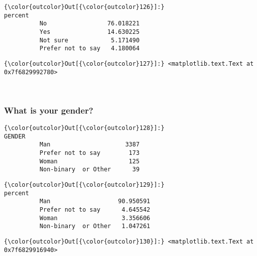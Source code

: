\documentclass[11pt]{article}
\begin{document}
            \begin{Verbatim}[commandchars=\\\{\}]
{\color{outcolor}Out[{\color{outcolor}126}]:}                      percent
          No                 76.018221
          Yes                14.630225
          Not sure            5.171490
          Prefer not to say   4.180064
\end{Verbatim}
        

            \begin{Verbatim}[commandchars=\\\{\}]
{\color{outcolor}Out[{\color{outcolor}127}]:} <matplotlib.text.Text at 0x7f6829992780>
\end{Verbatim}
        
    \begin{center}
    \end{center}
    { \hspace*{\fill} \\}
    

    \subsubsection{What is your gender?}\label{what-is-your-gender}


            \begin{Verbatim}[commandchars=\\\{\}]
{\color{outcolor}Out[{\color{outcolor}128}]:}                       GENDER
          Man                     3387
          Prefer not to say        173
          Woman                    125
          Non-binary  or Other      39
\end{Verbatim}
        

            \begin{Verbatim}[commandchars=\\\{\}]
{\color{outcolor}Out[{\color{outcolor}129}]:}                         percent
          Man                   90.950591
          Prefer not to say      4.645542
          Woman                  3.356606
          Non-binary  or Other   1.047261
\end{Verbatim}
        

            \begin{Verbatim}[commandchars=\\\{\}]
{\color{outcolor}Out[{\color{outcolor}130}]:} <matplotlib.text.Text at 0x7f6829916940>
\end{Verbatim}
        
\end{document}
